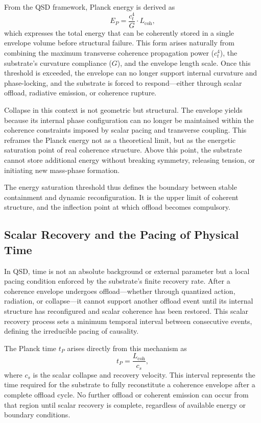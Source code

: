 \documentclass[entropy,article,submit,pdftex,moreauthors]{Definitions/mdpi}
\begin{document}
From the QSD framework, Planck energy is derived as
\[
E_P = \frac{c_t^4}{G} \cdot L_{\text{coh}},
\]
which expresses the total energy that can be coherently stored in a single envelope volume before structural failure. This form arises naturally from combining the maximum transverse coherence propagation power (\texorpdfstring{\( c_t^4 \)}{ct\^{}4}), the substrate’s curvature compliance (\texorpdfstring{\( G \)}{G}), and the envelope length scale. Once this threshold is exceeded, the envelope can no longer support internal curvature and phase-locking, and the substrate is forced to respond—either through scalar offload, radiative emission, or coherence rupture.

Collapse in this context is not geometric but structural. The envelope yields because its internal phase configuration can no longer be maintained within the coherence constraints imposed by scalar pacing and transverse coupling. This reframes the Planck energy not as a theoretical limit, but as the energetic saturation point of real coherence structure. Above this point, the substrate cannot store additional energy without breaking symmetry, releasing tension, or initiating new mass-phase formation.

The energy saturation threshold thus defines the boundary between stable containment and dynamic reconfiguration. It is the upper limit of coherent structure, and the inflection point at which offload becomes compulsory.
\subsection{Scalar Recovery and the Pacing of Physical Time}

In QSD, time is not an absolute background or external parameter but a local pacing condition enforced by the substrate’s finite recovery rate. After a coherence envelope undergoes offload—whether through quantized action, radiation, or collapse—it cannot support another offload event until its internal structure has reconfigured and scalar coherence has been restored. This scalar recovery process sets a minimum temporal interval between consecutive events, defining the irreducible pacing of causality.

The Planck time \texorpdfstring{\( t_P \)}{tP} arises directly from this mechanism as
\[
t_P = \frac{L_{\text{coh}}}{c_s},
\]
where \texorpdfstring{\( c_s \)}{cs} is the scalar collapse and recovery velocity. This interval represents the time required for the substrate to fully reconstitute a coherence envelope after a complete offload cycle. No further offload or coherent emission can occur from that region until scalar recovery is complete, regardless of available energy or boundary conditions.
\end{document}
